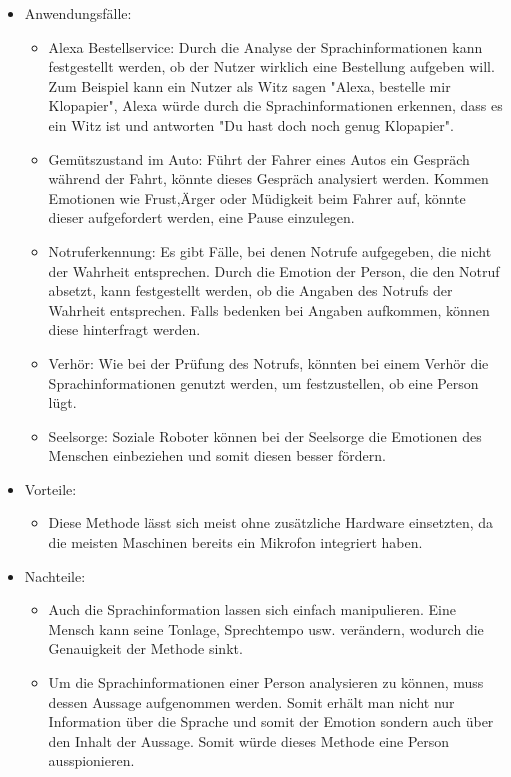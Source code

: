 \begin{itemize}
	\item Anwendungsfälle:
	\begin{itemize}
		\item Alexa Bestellservice: Durch die Analyse der Sprachinformationen kann festgestellt werden, ob der Nutzer wirklich eine Bestellung aufgeben will. Zum Beispiel kann ein Nutzer als Witz sagen "Alexa, bestelle mir Klopapier", Alexa würde durch die Sprachinformationen erkennen, dass es ein Witz ist und antworten "Du hast doch noch genug Klopapier".
		\item Gemütszustand im Auto: Führt der Fahrer eines Autos ein Gespräch während der Fahrt, könnte dieses Gespräch analysiert werden. Kommen Emotionen wie Frust,Ärger oder Müdigkeit beim Fahrer auf, könnte dieser aufgefordert werden, eine Pause einzulegen.
		\item Notruferkennung: Es gibt Fälle, bei denen Notrufe aufgegeben, die nicht der Wahrheit entsprechen. Durch die Emotion der Person, die den Notruf absetzt, kann festgestellt werden, ob die Angaben des Notrufs der Wahrheit entsprechen. Falls bedenken bei Angaben aufkommen, können diese hinterfragt werden.
		\item  Verhör: Wie bei der Prüfung des Notrufs, könnten bei einem Verhör die Sprachinformationen genutzt werden, um festzustellen, ob eine Person lügt.
		\item Seelsorge: Soziale Roboter können bei der Seelsorge die Emotionen des Menschen einbeziehen und somit diesen besser fördern.
	\end{itemize}
	\item Vorteile:
	\begin{itemize}
		\item Diese Methode lässt sich meist ohne zusätzliche Hardware einsetzten, da die meisten Maschinen bereits ein Mikrofon integriert haben.		 
	\end{itemize}
	\item Nachteile:
	\begin{itemize}
		\item Auch die Sprachinformation lassen sich einfach manipulieren. Eine Mensch kann seine Tonlage, Sprechtempo usw. verändern, wodurch die Genauigkeit der Methode sinkt.
		\item Um die Sprachinformationen einer Person analysieren zu können, muss dessen Aussage aufgenommen werden. Somit erhält man nicht nur Information über die Sprache und somit der Emotion sondern auch über den Inhalt der Aussage. Somit würde dieses Methode eine Person ausspionieren.
	\end{itemize}
\end{itemize}
